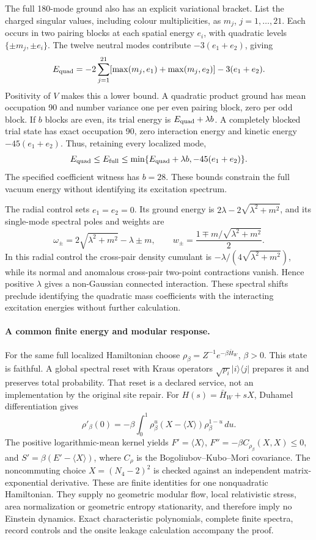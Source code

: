 The full 180-mode ground also has an explicit variational bracket. List
the charged singular values, including colour multiplicities, as
$m_j$, $j=1,\ldots,21$. Each occurs in two pairing blocks at each spatial
energy $e_i$, with quadratic levels $\{\pm m_j,\pm e_i\}$.
The twelve neutral modes contribute $-3(e_1+e_2)$, giving
\[
 E_{\rm quad}=-2\sum_{j=1}^{21}
 [\max(m_j,e_1)+\max(m_j,e_2)]-3(e_1+e_2).
\]
Positivity of $V$ makes this a lower bound. A quadratic product ground has
mean occupation 90 and number variance one per even pairing block, zero
per odd block. If $b$ blocks are even, its trial energy is
$E_{\rm quad}+\lambda b$. A completely blocked trial state has exact
occupation 90, zero interaction energy and kinetic energy $-45(e_1+e_2)$.
Thus, retaining every localized mode,
\[
 E_{\rm quad}\leq E_{\rm full}\leq
 \min\{E_{\rm quad}+\lambda b,-45(e_1+e_2)\}.
\]
The specified coefficient witness has $b=28$. These bounds constrain the
full vacuum energy without identifying its excitation spectrum.

The radial control sets $e_1=e_2=0$. Its ground energy is
$2\lambda-2\sqrt{\lambda^2+m^2}$, and its single-mode spectral poles and weights are
\[
 \omega_\pm=2\sqrt{\lambda^2+m^2}-\lambda\pm m,
 \qquad w_\pm=\frac{1\mp m/\sqrt{\lambda^2+m^2}}2.
\]
In this radial control the cross-pair density cumulant is
$-\lambda/(4\sqrt{\lambda^2+m^2})$, while its normal and anomalous
cross-pair two-point contractions vanish.  Hence positive $\lambda$
gives a non-Gaussian connected interaction.  These spectral shifts
preclude identifying the quadratic mass coefficients with the
interacting excitation energies without further calculation.

\paragraph{A common finite energy and modular response.}
For the same full localized Hamiltonian choose
$\rho_\beta=Z^{-1}e^{-\beta\bar H_W}$, $\beta>0$.
This state is faithful.  A global spectral reset with Kraus operators
$\sqrt{p_i}|i\rangle\langle j|$ prepares it and preserves total
probability.  That reset is a declared service, not an implementation
by the original site repair.  For $H(s)=\bar H_W+sX$, Duhamel
differentiation gives
\[
 \rho'_\beta(0)=-\beta\int_0^1
 \rho_\beta^u(X-\langle X\rangle)\rho_\beta^{1-u}\,du.
\]
The positive logarithmic-mean kernel yields
$F'=\langle X\rangle$,
$F''=-\beta C_{\rho_\beta}(X,X)\leq0$, and
$S'=\beta(E'-\langle X\rangle)$, where $C_\rho$ is the
Bogoliubov--Kubo--Mori covariance.  The noncommuting choice
$X=(N_4-2)^2$ is checked against an independent matrix-exponential
derivative.  These are finite identities for one nonquadratic
Hamiltonian.  They supply no geometric modular flow, local
relativistic stress, area normalization or geometric entropy
stationarity, and therefore imply no Einstein dynamics.
Exact characteristic polynomials, complete finite spectra, record controls and
the onsite leakage calculation accompany the proof.
